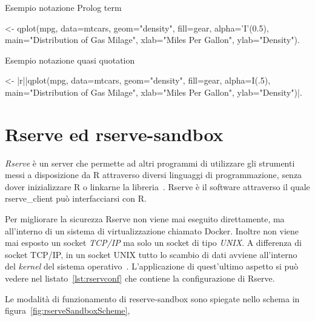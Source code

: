 \documentclass[10pt,titlepage,twoside,a4paper]{report}
\newenvironment{code}{\singlespacing\captionsetup{type=listing}}{}
\begin{document}
\begin{minipage}{\textwidth}
\centering
\begin{code}
    \caption{Esempio notazione Prolog term}
    \label{lst:esempioPrologTerm}
    \begin{prologcode*}{}
<- qplot(mpg, data=mtcars, geom="density", fill=gear, alpha='I'(0.5), main="Distribution of Gas Milage", xlab="Miles Per Gallon", ylab="Density").
    \end{prologcode*}
\end{code}

\begin{code}
    \caption{Esempio notazione quasi quotation}
    \label{lst:esempioquasiQuotation}
    \begin{prologcode*}{}
<- {|r||qplot(mpg, data=mtcars, geom="density", fill=gear, alpha=I(.5), main="Distribution of Gas Milage", xlab="Miles Per Gallon", ylab="Density")|}.
    \end{prologcode*}
\end{code}
\end{minipage}


\section{Rserve ed rserve-sandbox}

\emph{Rserve} è un server che permette ad altri programmi di
utilizzare gli strumenti messi a disposizione da R attraverso diversi
linguaggi di programmazione, senza dover inizializzare R o
linkarne la libreria~\cite{rserve}. Rserve è il software attraverso il quale 
rserve\_client può interfacciarsi con R.

Per migliorare la sicurezza Rserve non 
viene mai eseguito direttamente, ma all'interno di un sistema di 
virtualizzazione chiamato Docker. Inoltre non viene mai esposto un socket 
\emph{TCP/IP} ma solo un socket di tipo \emph{UNIX}. A differenza di socket 
TCP/IP, in un socket UNIX tutto lo scambio di dati avviene all'interno del 
\emph{kernel} del sistema operativo~\cite{unixSocket}. 
L'applicazione di quest'ultimo aspetto si può vedere nel 
listato~\ref{lst:rservconf} che contiene la configurazione di Rserve.

Le modalità di funzionamento di reserve-sandbox sono spiegate nello schema in 
figura~\ref{fig:rserveSandboxScheme}, 
\end{document}
